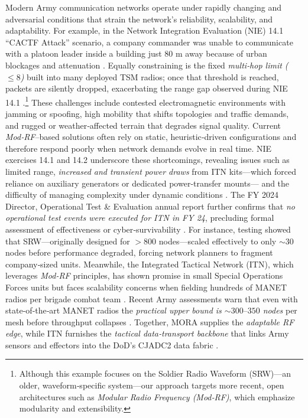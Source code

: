 \documentclass[doc.tex]{subfiles}
\begin{document}
Modern Army communication networks operate under rapidly changing and adversarial conditions that strain the network’s reliability, scalability, and adaptability. For example, in the Network Integration Evaluation (NIE) 14.1 “CACTF Attack” scenario, a company commander was unable to communicate with a platoon leader inside a building just 80 m away because of urban blockages and attenuation \cite{institutefordefensean2015analysis}. Equally constraining is the fixed \emph{multi‑hop limit (\(\le 8\))} built into many deployed TSM radios; once that threshold is reached, packets are silently dropped, exacerbating the range gap observed during NIE 14.1 \cite{trellisware2022ghost,US8873391B2}.\footnote{Although this example focuses on the Soldier Radio Waveform (SRW)—an older, waveform‑specific system—our approach targets more recent, open architectures such as \emph{Modular Radio Frequency (Mod‑RF)}, which emphasize modularity and extensibility.}
These challenges include contested electromagnetic environments with jamming or spoofing, high mobility that shifts topologies and traffic demands, and rugged or weather‑affected terrain that degrades signal quality. Current \emph{Mod‑RF}–based solutions often rely on static, heuristic‑driven configurations and therefore respond poorly when network demands evolve in real time. NIE exercises 14.1 and 14.2 \cite{institutefordefensean2015analysis} underscore these shortcomings, revealing issues such as limited range, \emph{increased and transient power draws} from ITN kits—which forced reliance on auxiliary generators or dedicated power‑transfer mounts— and the difficulty of managing complexity under dynamic conditions \cite{mobileCP2024}. The FY 2024 Director, Operational Test \& Evaluation annual report further confirms that \emph{no operational test events were executed for ITN in FY 24}, precluding formal assessment of effectiveness or cyber‑survivability \cite{dote2024itn}. For instance, testing showed that SRW—originally designed for \(>800\) nodes—scaled effectively to only \(\sim30\) nodes before performance degraded, forcing network planners to fragment company‑sized units. Meanwhile, the Integrated Tactical Network (ITN), which leverages \emph{Mod‑RF} principles, has shown promise in small Special Operations Forces units but faces scalability concerns when fielding hundreds of MANET radios per brigade combat team \cite{blumberg2020integrated}. Recent Army assessments warn that even with state‑of‑the‑art MANET radios the \emph{practical upper bound is \(\sim300\text{–}350\) nodes} per mesh before throughput collapses \cite{blumberg2020integrated}. Together, MORA supplies the \emph{adaptable RF edge}, while ITN furnishes the \emph{tactical data‑transport backbone} that links Army sensors and effectors into the DoD’s CJADC2 data fabric \cite{crsJADC2}.
\end{document}
